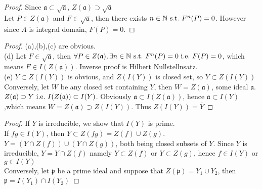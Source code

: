 \documentclass[leqno]{ltjsarticle}
\begin{document}
\begin{proof}
	Since $\mathfrak a \subset \sqrt{\mathfrak a}$, $Z(\mathfrak a) \supset \sqrt{\mathfrak a}$\\
	Let $P\in Z(\mathfrak a)$ and $F \in \sqrt{\mathfrak a}$, then there exists $n\in\mathbb N\ \mathrm{s.t.}\  F^n(P) = 0$. However since $A$ is integral domain, $F(P)=0$.
\end{proof}
\begin{proof}
	(a),(b),(c) are obvious.\\
	(d)	Let $F\in\sqrt{\mathfrak a}$, then $\forall P\in Z(\mathfrak a),\exists n\in\mathbb N\ \mathrm{s.t.}\  F^n(P)=0\ \mathrm{i.e.}\  F(P)=0$, which means $F\in I(Z(\mathfrak a))$. Inverse proof is Hilbert Nullstellnsatz.\\
	(e) $Y \subset Z(I(Y))$ is obvious, and $Z(I(Y))$ is closed set, so $\overline Y \subset Z(I(Y))$\\
	Conversely, let $W$ be any closed set containing $Y$, then $W = Z(\mathfrak a)$, some ideal $\mathfrak a$. $Z(\mathfrak a) \supset Y \ \mathrm{i.e.}\  I(Z(\mathfrak a)) \subset I(Y)$. Obviously $\mathfrak a\subset I(Z(\mathfrak a))$, hence $\mathfrak a \subset I(Y)$ ,which means $W=Z(\mathfrak a) \supset Z(I(Y))$. Thus $Z(I(Y))=\overline Y$
\end{proof}

\begin{proof}
	If $Y$ is irreducible, we show that $I(Y)$ is prime.\\
	If $fg\in I(Y)$, then $Y\subset Z(fg) = Z(f)\cup Z(g)$. $Y = (Y\cap Z(f)) \cup (Y\cap Z(g))$, both being closed subsets of $Y$. Since $Y$ is irreducible, $Y = Y\cap Z(f)$ namely $Y\subset Z(f)$ or $Y\subset Z(g)$, hence $f\in I(Y)$ or $g\in I(Y)$\\
	Conversely, let $\mathfrak p$ be a prime ideal and suppose that $Z(\mathfrak p) = Y_1 \cup Y_2$, then $\mathfrak p = I(Y_1) \cap I(Y_2)$
\end{proof}
\end{document}
